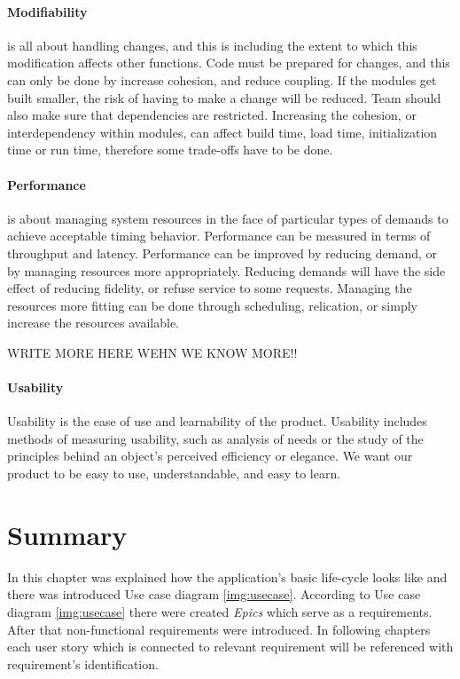 \paragraph{Modifiability}
is all about handling changes, and this is including the extent to which this modification affects other functions. 
Code must be prepared for changes, and this can only be done by increase cohesion, and reduce coupling. 
If the modules get built smaller, the risk of having to make a change will be reduced. 
Team should also make sure that dependencies are restricted. 
Increasing the cohesion, or interdependency within modules, can affect build time, load time, initialization time or run time, therefore some trade-offs have to be done.

\paragraph{Performance}
is about managing system resources in the face of particular types of demands to achieve acceptable timing behavior. 
Performance can be measured in terms of throughput and latency. 
Performance can be improved by reducing demand, or by managing resources more appropriately. 
Reducing demands will have the side effect of reducing fidelity, or refuse service to some requests. 
Managing the resources more fitting can be done through scheduling, relication, or simply increase the resources available.

WRITE MORE HERE WEHN WE KNOW MORE!!


\paragraph{Usability}
Usability is the ease of use and learnability of the product.
Usability includes methods of measuring usability, such as analysis of needs or the study of the principles behind an object's perceived efficiency or elegance. We want our product to be easy to use, understandable, and easy to learn.  

\section{Summary}
In this chapter was explained how the application's basic life-cycle looks like and there was introduced Use case diagram \ref{img:usecase}.
According to Use case diagram \ref{img:usecase} there were created \emph{Epics} which serve as a requirements. 
After that non-functional requirements were introduced.
In following chapters each user story which is connected to relevant requirement will be referenced with requirement's identification.

